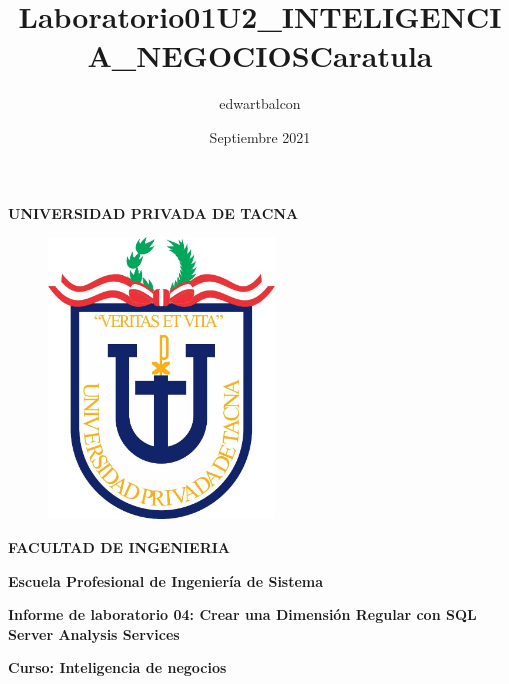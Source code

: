 \documentclass{article}
\title{Laboratorio01U2_INTELIGENCIA_NEGOCIOS}
\author{edwartbalcon}
\date{Septiembre 2021}
\begin{document}
\title{Caratula}

\begin{titlepage}
\begin{center}
\begin{Large}
\textbf{UNIVERSIDAD PRIVADA DE TACNA} \\
\end{Large}
\vspace*{-0.025in}
\begin{figure}[htb]
\begin{center}
\includegraphics[width=6cm]{./images/logo_UPT}
\end{center}
\end{figure}
\vspace*{-0.025in}
\begin{Large}
\textbf{FACULTAD DE INGENIERIA} \\
\end{Large}
\vspace*{0.05in}
\begin{Large}
\textbf{Escuela Profesional de Ingeniería de Sistema} \\
\end{Large}


\vspace*{0.4in}

\vspace*{0.1in}
\begin{Large}
\textbf{Informe de laboratorio 04: Crear una Dimensión Regular con SQL
Server Analysis Services} \\
\end{Large}

\vspace*{0.3in}
\begin{Large}
\textbf{Curso: Inteligencia de negocios} \\
\end{Large}


\end{center}
\end{titlepage}
\end{document}
